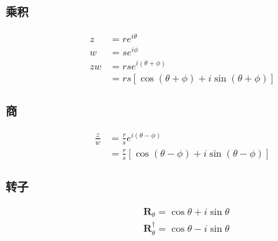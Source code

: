 \subsubsection*{乘积}
$$
\begin{aligned}
z & =r e^{i \theta} \\
w & =s e^{i \phi} \\
z w & =r s e^{i(\theta+\phi)} \\
& =r s[\cos (\theta+\phi)+i \sin (\theta+\phi)]
\end{aligned}
$$

\subsubsection*{商}
$$
\begin{aligned}
\frac{z}{w} & =\frac{r}{s} e^{i(\theta-\phi)} \\
& =\frac{r}{s}[\cos (\theta-\phi)+i \sin (\theta-\phi)]
\end{aligned}
$$

\subsubsection*{转子}
$$
\begin{aligned}
& \mathbf{R}_{\theta}=\cos \theta+i \sin \theta \\
& \mathbf{R}_{\theta}^{\dagger}=\cos \theta-i \sin \theta
\end{aligned}
$$

